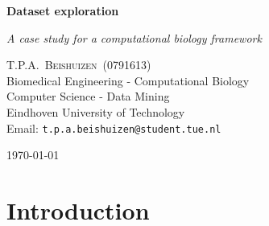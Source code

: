 \documentclass[10pt,a4paper]{article}
\newcommand{\documenttitle}{Dataset exploration}
\newcommand{\documentsubtitle}{A case study for a computational biology framework}
\begin{document}
	
	\begin{titlepage}
		
		\center
		
		\vspace*{3cm}
		
		\textbf{\huge \documenttitle}
		
		\textit{\LARGE \documentsubtitle}
		
		\vspace*{2cm}
		
		\large
		\centering
		T.P.A.~\textsc{Beishuizen}~(0791613)\\
		Biomedical Engineering - Computational Biology\\
		Computer Science - Data Mining\\
		Eindhoven University of Technology\\
		Email: \texttt{t.p.a.beishuizen@student.tue.nl}
		
		\vfill
		
		\vspace*{1cm}
		
		\today
		
	\end{titlepage}
	
	\tableofcontents
	
	
	\pagestyle{fancy}
	\fancyhead{} %
	\fancyfoot{} %
	\renewcommand{\headrulewidth}{0.4pt}
	\renewcommand{\footrulewidth}{0.4pt}
	
	\fancyhead[L]{\rightmark}
	\fancyfoot[C]{\thepage}
	
	
	\clearpage
	
	\section{Introduction}
	\label{sec:Introduction}
	
\end{document}
